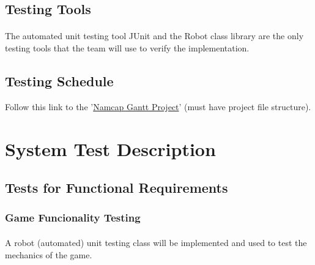 \documentclass[12pt, titlepage]{article}
\begin{document}
\subsection{Testing Tools}
\paragraph{}
The automated unit testing tool JUnit and the Robot class library are the only testing tools that the team will use to verify the implementation.

\subsection{Testing Schedule}
		
Follow this link to the '\href{run:../DevelopmentPlan/NamcapGanttProject.gan}{Namcap Gantt Project}' (must have project file structure).

\section{System Test Description}
	
\subsection{Tests for Functional Requirements}

\subsubsection{Game Funcionality Testing}
		
\paragraph{}
A robot (automated) unit testing class will be implemented and used to test the mechanics of the game.
\end{document}

